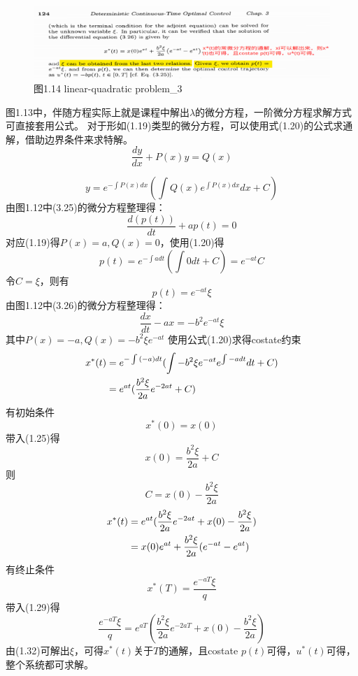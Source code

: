 \documentclass[40pt,a4paper,UTF8]{ctexart}
\numberwithin{equation}{section}
\begin{document}
\begin{figure}[H]
\centering
    \includegraphics[width=4.8in]{ch4_14.png} {图1.14 linear-quadratic problem\_3\cite{ref1}}
\end{figure}
图1.13中，伴随方程实际上就是课程中解出$\lambda$的微分方程，一阶微分方程求解方式可直接套用公式。
对于形如(1.19)类型的微分方程，可以使用式(1.20)的公式求通解，借助边界条件来求特解。
\begin{equation}
    \frac{dy}{dx}+P(x)y=Q(x)
\end{equation}

\begin{equation}
    y=e^{-\int{P(x)dx}}(\int{Q(x)e^{\int{P(x)dx}}dx+C})
\end{equation}
由图1.12中(3.25)的微分方程整理得：
\begin{equation}
    \frac{d(p(t))}{dt}+ap(t)=0    
\end{equation}
对应(1.19)得$P(x)=a,Q(x)=0$，使用(1.20)得
\begin{equation}
    p(t)=e^{-\int{adt}}(\int{0dt+C}) = e^{-at}C
\end{equation}
令$C=\xi$，则有
\begin{equation}
    p(t)=e^{-at}\xi
\end{equation}
由图1.12中(3.26)的微分方程整理得：
\begin{equation}
    \frac{dx}{dt}-ax =-b^2e^{-at}\xi
\end{equation}
其中$P(x)=-a,Q(x)=-b^2\xi e^{-at}$
使用公式(1.20)求得costate约束
\begin{align}
    x^*(t) &= e^{-\int{(-a)dt}}(\int{-b^2\xi e^{-at}e^{\int{-a dt}}dt}+C)    \notag \\
    &=e^{at}(\frac{b^2\xi}{2a}e^{-2at}+C)
\end{align}
有初始条件
\begin{equation}
    x^*(0)=x(0)
\end{equation}
带入(1.25)得
\begin{equation}
    x(0)=\frac{b^2\xi}{2a}+C
\end{equation}
则
\begin{equation}
    C=x(0)-\frac{b^2\xi}{2a}
\end{equation}
\begin{align}
    x^*(t) &=e^{at}(\frac{b^2\xi}{2a}e^{-2at}+x(0)-\frac{b^2\xi}{2a}) \notag \\
    &=x(0)e^{at}+\frac{b^2\xi}{2a}(e^{-at}-e^{at})
\end{align}
有终止条件
\begin{equation}
    x^*(T)=\frac{e^{-aT}\xi}{q}
\end{equation}
带入(1.29)得
\begin{equation}
    \frac{e^{-aT}\xi}{q} = e^{aT}(\frac{b^2\xi}{2a}e^{-2aT}+x(0)-\frac{b^2\xi}{2a})
\end{equation}
由(1.32)可解出$\xi$，可得$x^*(t)$关于$T$的通解，且costate $p(t)$可得，$u^*(t)$可得，整个系统都可求解。
\end{document}
